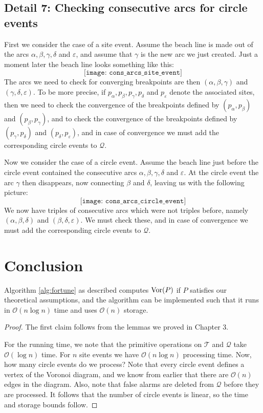 \subsection*{Detail 7: Checking consecutive arcs for circle events}
First we consider the case of a site event. Assume the beach line is made out of the arcs $\alpha, \beta, \gamma, \delta$ and $\varepsilon$, and assume that $\gamma$ is the new arc we just created. Just a moment later the beach line looks something like this:
\[
    \texttt{[image: cons\_arcs\_site\_event]}
\]
The arcs we need to check for converging breakpoints are then $(\alpha, \beta, \gamma)$ and $(\gamma, \delta, \varepsilon)$. To be more precise, if $p_{\alpha}, p_{\beta}, p_{\gamma}, p_{\delta}$ and $p_{\varepsilon}$ denote the associated sites, then we need to check the convergence of the breakpoints defined by $(p_{\alpha}, p_{\beta})$ and $(p_{\beta}, p_{\gamma})$, and to check the convergence of the breakpoints defined by $(p_{\gamma}, p_{\delta})$ and $(p_{\delta}, p_{\varepsilon})$, and in case of convergence we must add the corresponding circle events to $\mathcal{Q}$.

Now we consider the case of a circle event. Assume the beach line just before the circle event contained the consecutive arcs $\alpha, \beta, \gamma, \delta$ and $\varepsilon$. At the circle event the arc $\gamma$ then disappears, now connecting $\beta$ and $\delta$, leaving us with the following picture:
\[
    \texttt{[image: cons\_arcs\_circle\_event]}
\]
We now have triples of consecutive arcs which were not triples before, namely $(\alpha, \beta, \delta)$ and $(\beta, \delta, \varepsilon)$. We must check these, and in case of convergence we must add the corresponding circle events to $\mathcal{Q}$.


\section{Conclusion}
\begin{thm}
Algorithm \ref{alg:fortune} as described computes $\operatorname{Vor}(P)$ if $P$ satisfies our theoretical assumptions, and the algorithm can be implemented such that it runs in $\mathcal{O}(n \log n)$ time and uses $\mathcal{O}(n)$ storage.
\end{thm}
\begin{proof}
The first claim follows from the lemmas we proved in Chapter 3.

For the running time, we note that the primitive operations on $\mathcal{T}$ and $\mathcal{Q}$ take $\mathcal{O}(\log n)$ time. For $n$ site events we have $\mathcal{O}(n \log n)$ processing time. Now, how many circle events do we process? Note that every circle event defines a vertex of the Voronoi diagram, and we know from earlier that there are $\mathcal{O}(n)$ edges in the diagram. Also, note that false alarms are deleted from $\mathcal{Q}$ before they are processed. It follows that the number of circle events is linear, so the time and storage bounds follow.
\end{proof}